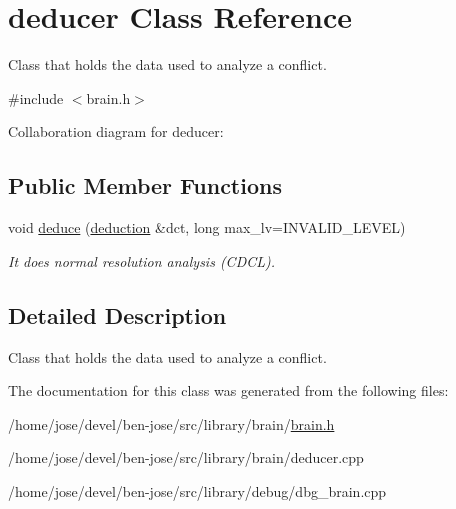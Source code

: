 \hypertarget{classdeducer}{}\section{deducer Class Reference}
\label{classdeducer}


Class that holds the data used to analyze a conflict.  




{\ttfamily \#include $<$brain.\+h$>$}



Collaboration diagram for deducer\+:
\subsection*{Public Member Functions}
\begin{DoxyCompactItemize}
\item 
void \hyperlink{classdeducer_a7db42a9dfc25ed6ed6747faea2c90961}{deduce} (\hyperlink{classdeduction}{deduction} \&dct, long max\+\_\+lv=I\+N\+V\+A\+L\+I\+D\+\_\+\+L\+E\+V\+EL)\hypertarget{classdeducer_a7db42a9dfc25ed6ed6747faea2c90961}{}\label{classdeducer_a7db42a9dfc25ed6ed6747faea2c90961}

\begin{DoxyCompactList}\small\item\em It does normal resolution analysis (C\+D\+CL). \end{DoxyCompactList}\end{DoxyCompactItemize}


\subsection{Detailed Description}
Class that holds the data used to analyze a conflict. 

The documentation for this class was generated from the following files\+:\begin{DoxyCompactItemize}
\item 
/home/jose/devel/ben-\/jose/src/library/brain/\hyperlink{brain_8h}{brain.\+h}\item 
/home/jose/devel/ben-\/jose/src/library/brain/deducer.\+cpp\item 
/home/jose/devel/ben-\/jose/src/library/debug/dbg\+\_\+brain.\+cpp\end{DoxyCompactItemize}

